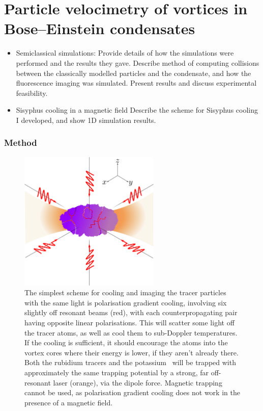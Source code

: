 
\chapter{Particle velocimetry of vortices in Bose–Einstein condensates}

\begin{itemize}
\item Semiclassical simulations:
Provide details of how the simulations were performed and the results they gave. Describe method of computing collisions between the classically modelled particles and the condensate, and how the fluorescence imaging was simulated. Present results and discuss experimental feasibility.

\item{Sisyphus cooling in a magnetic field}
Describe the scheme for Sisyphus cooling I developed, and show 1D simulation results.

\end{itemize}


\subsection{Method}

\begin{figure}
\begin{center}
\includegraphics[width=0.6\textwidth]{figures/unsorted/setup.png}
\caption{\label{fig:setup}The simplest scheme for cooling and imaging the tracer particles with the same light is polarisation gradient cooling, involving six slightly off resonant beams (red), with each counterpropagating pair having opposite linear polarisations. This will scatter some light off the tracer atoms, as well as cool them to sub-Doppler temperatures. If the cooling is sufficient, it should encourage the atoms into the vortex cores where their energy is lower, if they aren't already there. Both the rubidium tracers and the potassium \bec\ will be trapped with approximately the same trapping potential by a strong, far off-resonant laser (orange), via the dipole force. Magnetic trapping cannot be used, as polarisation gradient cooling does not work in the presence of a magnetic field.}
\end{center}
\end{figure}


